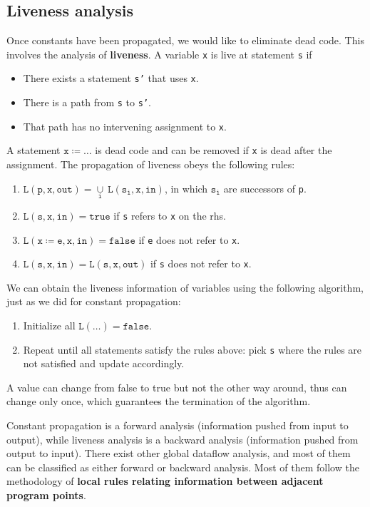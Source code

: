 \subsection{Liveness analysis}
Once constants have been propagated, we would like to eliminate dead code. This involves the analysis of \textbf{liveness}. A variable \texttt{x} is live at statement \texttt{s} if 
\begin{itemize}
\item There exists a statement \texttt{s'} that uses \texttt{x}.
\item There is a path from \texttt{s} to \texttt{s'}.
\item That path has no intervening assignment to \texttt{x}.
\end{itemize}
A statement $\mathtt{x\coloneqq \dots}$ is dead code and can be removed if \texttt{x} is dead after the assignment. The propagation of liveness obeys the following rules:
\begin{enumerate}
\item $\mathtt{L(p,x,out) = \underset{i}{\cup}\:L(s_i,x,in)}$, in which $\mathtt{s_i}$ are successors of \texttt{p}.
\item $\mathtt{L(s,x,in)=true}$ if \texttt{s} refers to \texttt{x} on the rhs.
\item $\mathtt{L(x\coloneqq e,x,in)=false}$ if \texttt{e} does not refer to \texttt{x}.
\item $\mathtt{L(s,x,in)=L(s,x,out)}$ if \texttt{s} does not refer to \texttt{x}.
\end{enumerate}
We can obtain the liveness information of variables using the following algorithm, just as we did for constant propagation:
\begin{enumerate}
\item Initialize all $\mathtt{L(\dots)=false}$.
\item Repeat until all statements satisfy the rules above: pick \texttt{s} where the rules are not satisfied and update accordingly.
\end{enumerate}
A value can change from false to true but not the other way around, thus can change only once, which guarantees the termination of the algorithm.

Constant propagation is a forward analysis (information pushed from input to output), while liveness analysis is a backward analysis (information pushed from output to input). There exist other global dataflow analysis, and most of them can be classified as either forward or backward analysis. Most of them follow the methodology of \textbf{local rules relating information between adjacent program points}. 
\ifx\PREAMBLE\undefined

\fi